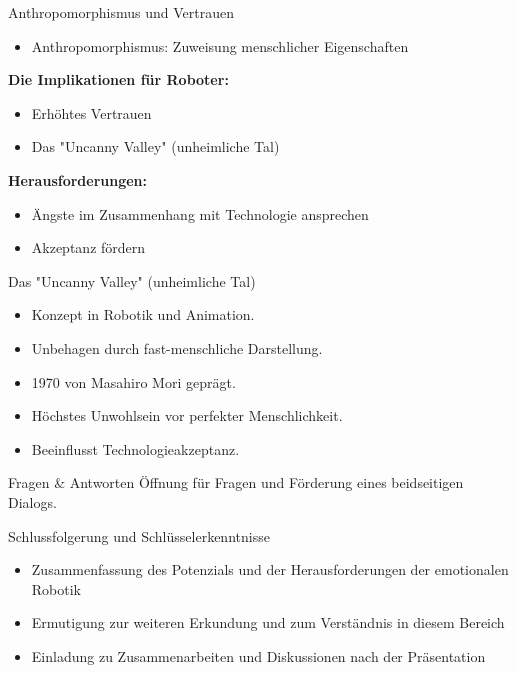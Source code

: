 \documentclass[aspectratio=169]{beamer}
\begin{document}
\begin{frame}{Anthropomorphismus und Vertrauen}
  \begin{itemize}
      \item Anthropomorphismus: Zuweisung menschlicher Eigenschaften
  \end{itemize}
  \textbf{Die Implikationen für Roboter:}
  \begin{itemize}
      \item Erhöhtes Vertrauen
      \item Das "Uncanny Valley" (unheimliche Tal)
  \end{itemize}
  \textbf{Herausforderungen:}
  \begin{itemize}
      \item Ängste im Zusammenhang mit Technologie ansprechen
      \item Akzeptanz fördern
  \end{itemize}
\end{frame}

\begin{frame}{Das "Uncanny Valley" (unheimliche Tal)}
  \begin{itemize}
      \item Konzept in Robotik und Animation.
      \item Unbehagen durch fast-menschliche Darstellung.
      \item 1970 von Masahiro Mori geprägt.
      \item Höchstes Unwohlsein vor perfekter Menschlichkeit.
      \item Beeinflusst Technologieakzeptanz.
  \end{itemize}
\end{frame}

\begin{frame}{Fragen \& Antworten}
  Öffnung für Fragen und Förderung eines beidseitigen Dialogs.
\end{frame}

\begin{frame}{Schlussfolgerung und Schlüsselerkenntnisse}
  \begin{itemize}
      \item Zusammenfassung des Potenzials und der Herausforderungen der emotionalen Robotik
      \item Ermutigung zur weiteren Erkundung und zum Verständnis in diesem Bereich
      \item Einladung zu Zusammenarbeiten und Diskussionen nach der Präsentation
  \end{itemize}
\end{frame}
\end{document}
